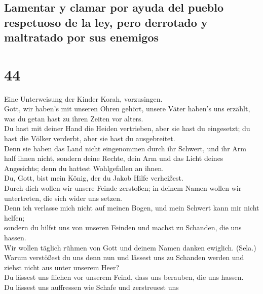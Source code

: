 \hypertarget{lamentar-y-clamar-por-ayuda-del-pueblo-respetuoso-de-la-ley-pero-derrotado-y-maltratado-por-sus-enemigos}{%
\subsection{Lamentar y clamar por ayuda del pueblo respetuoso de la ley,
pero derrotado y maltratado por sus
enemigos}\label{lamentar-y-clamar-por-ayuda-del-pueblo-respetuoso-de-la-ley-pero-derrotado-y-maltratado-por-sus-enemigos}}

\hypertarget{section-43}{%
\section{44}\label{section-43}}

 Eine Unterweisung der Kinder Korah, vorzusingen.\\
 Gott, wir haben's mit unseren Ohren gehört, unsere Väter
haben's uns erzählt, was du getan hast zu ihren Zeiten vor alters.\\
 Du hast mit deiner Hand die Heiden vertrieben, aber sie
hast du eingesetzt; du hast die Völker verderbt, aber sie hast du
ausgebreitet.\\
 Denn sie haben das Land nicht eingenommen durch ihr
Schwert, und ihr Arm half ihnen nicht, sondern deine Rechte, dein Arm
und das Licht deines Angesichts; denn du hattest Wohlgefallen an
ihnen.\\
 Du, Gott, bist mein König, der du Jakob Hilfe
verheißest.\\
 Durch dich wollen wir unsere Feinde zerstoßen; in deinem
Namen wollen wir untertreten, die sich wider uns setzen.\\
 Denn ich verlasse mich nicht auf meinen Bogen, und mein
Schwert kann mir nicht helfen;\\
 sondern du hilfst uns von unseren Feinden und machst zu
Schanden, die uns hassen.\\
 Wir wollen täglich rühmen von Gott und deinem Namen
danken ewiglich. (Sela.)\\
 Warum verstößest du uns denn nun und lässest uns zu
Schanden werden und ziehst nicht aus unter unserem Heer?\\
 Du lässest uns fliehen vor unserem Feind, dass uns
berauben, die uns hassen.\\
 Du lässest uns auffressen wie Schafe und zerstreuest uns
